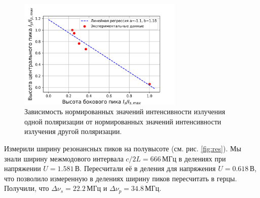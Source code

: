 \documentclass[12pt, russian, a4paper]{article}
\begin{document}
	\begin{figure}[htbp]
		\centering
		\includegraphics[width=0.7\textwidth]{../images/I-p-vs-I-s.png}
		\caption{Зависимость нормированных значений интенсивности излучения одной поляризации от нормированных значений интенсивности излучения другой поляризации.}
		\label{fig:I-p-vs-I-s}
	\end{figure}

	Измерили ширину резонансных пиков на полувысоте (см. рис. \ref{fig:res}). Мы знали ширину межмодового интервала $c/2L = 666\,\text{МГц}$ в делениях при напряжении $U=1.581\,\text{В}$. Пересчитали её в деления для напряжения $U=0.618\,\text{В}$, что позволило измеренную в делениях ширину пиков пересчитать в герцы. Получили, что $\Delta\nu_s = 22.2\,\text{МГц}$ и $\Delta\nu_p = 34.8\,\text{МГц}$.
\end{document}
